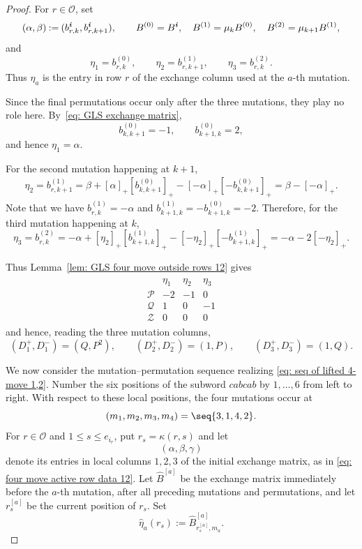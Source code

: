 \documentclass[12pt, leqno]{amsart}
\numberwithin{equation}{section}
\theoremstyle{plain}
\theoremstyle{definition}
\renewcommand{\le}{\leqslant}
\newcommand{\seteq}{\mathbin{:=}}
\newcommand{\ii}{ \textbf{\textit{i}}}
\newcommand{\hB}{\widehat{B}}
\newcommand{\heta}{\widehat{\eta}}
\newcommand{\calO}{\mathcal{O}}
\newcommand{\calP}{\mathcal{P}}
\newcommand{\calQ}{\mathcal{Q}}
\newcommand{\calZ}{\mathcal{Z}}
\begin{document}
\begin{proof}
For  $r\in\calO$, set
\[
(\alpha,\beta)\seteq(b^\ii_{r,k},b^\ii_{r,k+1}),
\qquad
B^{(0)}=B^\ii,\quad B^{(1)}=\mu_kB^{(0)},\quad B^{(2)}=\mu_{k+1}B^{(1)},
\]
and
\[
\eta_1=b^{(0)}_{r,k}, \qquad \eta_2=b^{(1)}_{r,k+1}, \qquad \eta_3=b^{(2)}_{r,k}.
\]
Thus $\eta_a$ is the entry in row $r$ of the exchange column used at the $a$-th mutation.

Since  the final permutations  occur only after the three mutations,
they play no role here. By~\eqref{eq: GLS exchange matrix},
\[
b^{(0)}_{k,k+1}=-1,\qquad b^{(0)}_{k+1,k}=2,
\]
and hence $\eta_1=\alpha$.

For the second mutation happening at $k+1$,
\[
\begin{aligned}
\eta_2 =b^{(1)}_{r,k+1} =\beta  +[\alpha]_+[b^{(0)}_{k,k+1}]_+  -[-\alpha]_+[-b^{(0)}_{k,k+1}]_+ =\beta-[-\alpha]_+.
\end{aligned}
\]
Note that we have
$b^{(1)}_{r,k}=-\alpha$ and $b^{(1)}_{k+1,k} =-b^{(0)}_{k+1,k} =-2$.
Therefore, for the third mutation happening at $k$,
\[
\eta_3 =b^{(2)}_{r,k} =-\alpha +[\eta_2]_+[b^{(1)}_{k+1,k}]_+ -[-\eta_2]_+[-b^{(1)}_{k+1,k}]_+ =-\alpha-2[-\eta_2]_+.
\]

Thus Lemma~\ref{lem: GLS four move outside rows 12} gives
\begin{align}\label{eq: PQZ matrix}
\begin{array}{c|ccc}
 &\eta_1&\eta_2&\eta_3\\ \hline
\calP&-2&-1&0\\
\calQ&1&0&-1\\
\calZ&0&0&0
\end{array}
\end{align}
and hence, reading the three mutation columns,
\[
(D_1^+,D_1^-)=(Q,P^2),\qquad
(D_2^+,D_2^-)=(1,P),\qquad
(D_3^+,D_3^-)=(1,Q).
\]

 We now consider the mutation--permutation sequence realizing
\eqref{eq: seq of lifted 4-move 1,2}.
 Number the six positions of the subword $cabcab$
by $1,\ldots,6$ from left to right. With respect to these local
positions, the four mutations occur at
\[
(m_1,m_2,m_3,m_4)=\seq{3,1,4,2}.
\]
 For $r\in\calO$ and $1\le s\le e_{i_r}$, put
$r_s=\kappa(r,s)$ and let
\[
(\alpha,\beta,\gamma)
\]
denote its entries in local columns $1,2,3$ of the initial
  exchange matrix, as in \eqref{eq: four move active row data 12}.
Let $\hB^{[a]}$ be the exchange matrix immediately before the
$a$-th mutation, after all preceding mutations and permutations, and
let $r_s^{[a]}$ be the current position of $r_s$. Set
\[
\heta_a(r_s)\seteq
\hB^{[a]}_{r_s^{[a]},m_a}.
\]



\end{proof}
\end{document}
